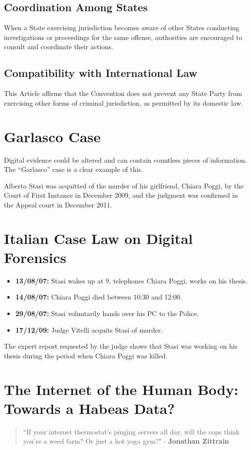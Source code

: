\subsection{Coordination Among States}
When a State exercising jurisdiction becomes aware of other States
conducting investigations or proceedings for the same offense,
authorities are encouraged to consult and coordinate their actions.

\subsection{Compatibility with International Law}
This Article affirms that the Convention does not prevent any State
Party from exercising other forms of criminal jurisdiction, as
permitted by its domestic law.

\section{Garlasco Case}
Digital evidence could be altered and can contain countless pieces of
information. The “Garlasco” case is a clear example of this.

Alberto Stasi was acquitted of the murder of his girlfriend, Chiara
Poggi, by the Court of First Instance in December 2009, and the
judgment was confirmed in the Appeal court in December 2011.

\section{Italian Case Law on Digital Forensics}
\begin{itemize}
    \item \textbf{13/08/07:} Stasi wakes up at 9, telephones Chiara
      Poggi, works on his thesis.
    \item \textbf{14/08/07:} Chiara Poggi died between 10:30 and
      12:00.
    \item \textbf{29/08/07:} Stasi voluntarily hands over his PC to
      the Police.
    \item \textbf{17/12/09:} Judge Vitelli acquits Stasi of murder.
\end{itemize}
The expert report requested by the judge shows that Stasi was working
on his thesis during the period when Chiara Poggi was killed.

\section{The Internet of the Human Body: Towards a Habeas Data?}
\begin{quote}
    “If your internet thermostat's pinging servers all day, will the
    cops think you're a weed farm? Or just a hot yoga gym?" -
    \textbf{Jonathan Zittrain}
\end{quote}

